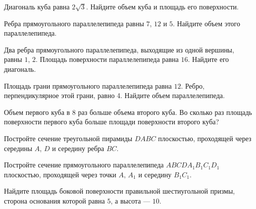 \begin{class}[number=5]
	\begin{listofex}
		\item Диагональ куба равна \( 2\sqrt{3} \). Найдите объем куба и площадь его поверхности.
		\item Ребра прямоугольного параллелепипеда равны \( 7 \), \( 12 \) и \( 5 \).
		Найдите объем этого параллелепипеда.
		\item Два ребра прямоугольного параллелепипеда, выходящие из одной вершины, равны \( 1 \), \( 2 \).
		Площадь поверхности параллелепипеда равна \( 16 \). Найдите его диагональ.
		\item Площадь грани прямоугольного параллелепипеда равна \( 12 \). Ребро, перпендикулярное этой грани, равно 4. Найдите объем параллелепипеда.
		\item Объем первого куба в \( 8 \) раз больше объема второго куба.
		Во сколько раз площадь поверхности первого куба больше площади поверхности второго куба?
		\item Постройте сечение треугольной пирамиды \( DABC \) плоскостью,
		проходящей через середины \( A \), \( D \) и середину ребра \( BC \).
		\item Постройте сечение прямоугольного параллелепипеда \( ABCDA_1B_1C_1D_1 \)
		плоскостью, проходящей через точки \( A \), \( A_1 \) и середину \( B_1C_1 \).
		\item Найдите площадь боковой поверхности правильной шестиугольной призмы, сторона основания которой равна \( 5 \), а высота  --- \( 10 \).
	\end{listofex}
\end{class}

